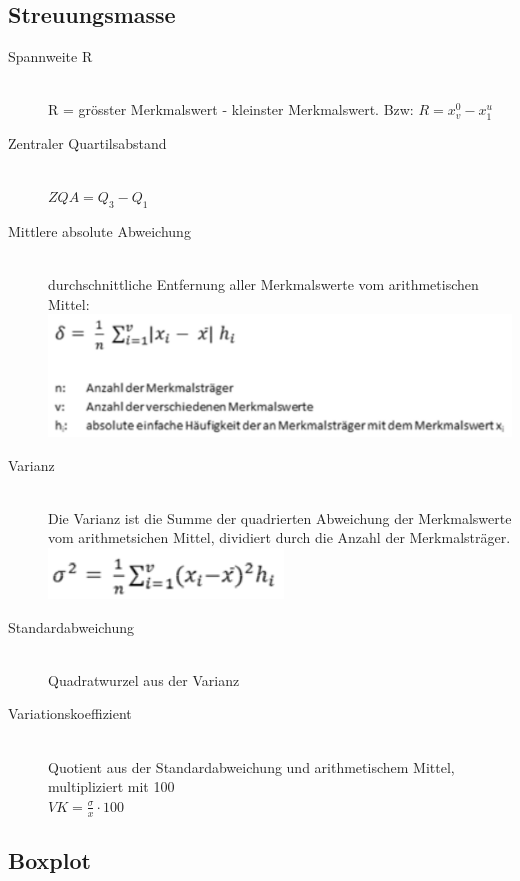 \subsection{Streuungsmasse}
\begin{description}
	\item[Spannweite R] \hfill \\
		R = grösster Merkmalswert - kleinster Merkmalswert. Bzw: $R = x_v^0 - x_1^u$
	\item[Zentraler Quartilsabstand] \hfill \\
		$ZQA  = Q_3 - Q_1$
	\item[Mittlere absolute Abweichung] \hfill \\
		durchschnittliche Entfernung aller Merkmalswerte vom arithmetischen Mittel: \\
		\includegraphics[scale=0.3]{img/mittlere_absolute_abweichung.png}
	\item[Varianz] \hfill \\
	Die Varianz ist die Summe der quadrierten Abweichung der Merkmalswerte vom arithmetsichen Mittel, dividiert durch die Anzahl der Merkmalsträger. \\
		\includegraphics[scale=0.3]{img/varianz.png}
	\item[Standardabweichung] \hfill \\
		Quadratwurzel aus der Varianz
	\item[Variationskoeffizient] \hfill \\
		Quotient aus der Standardabweichung und arithmetischem Mittel, multipliziert mit 100 \\
		$VK = \frac{\sigma}{x} \cdot 100$
		
	
\end{description}

\subsection{Boxplot}


